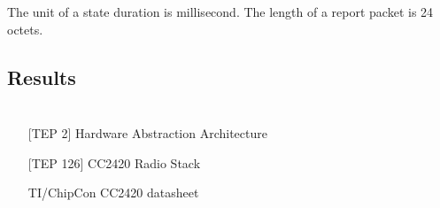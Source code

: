 \documentclass[a4paper,11pt]{article}
\begin{document}
The unit of a state duration is millisecond.
The length of a report packet is 24 octets.

  \subsection{Results}



\section{}

\section*{}
  \begin{itemize}
    \item[] [TEP 2] Hardware Abstraction Architecture
    \item[] [TEP 126] CC2420 Radio Stack
    \item[] TI/ChipCon CC2420 datasheet
  \end{itemize}

\section*{}
\end{document}

